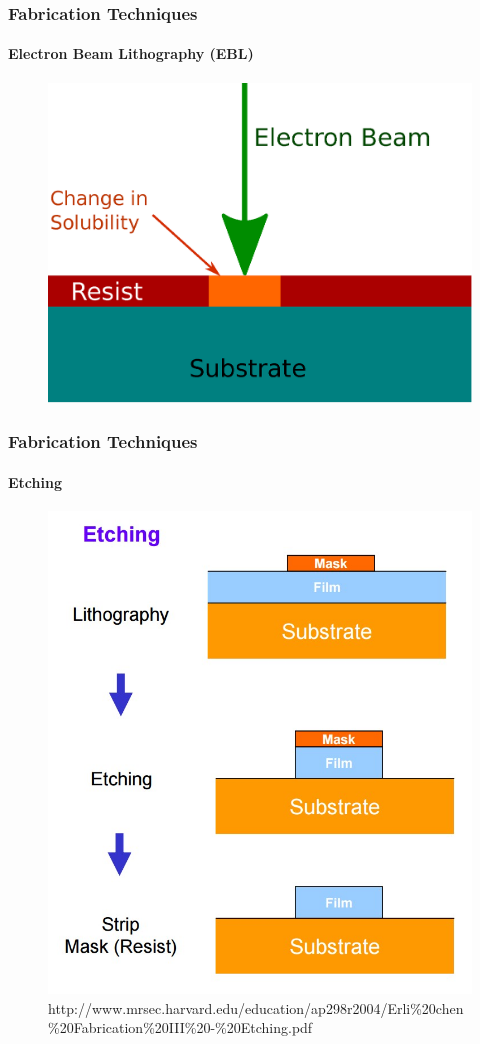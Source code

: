 \documentclass{beamer}
\begin{document}

\begin{frame}
    \frametitle{Fabrication Techniques}
    \framesubtitle{Electron Beam Lithography (EBL)}
    \begin{figure}[!htb]
        \centering
        \includegraphics[height=0.8\textheight]{img/ebeam.eps}
    \end{figure}
\end{frame}


\begin{frame}
    \frametitle{Fabrication Techniques}
    \framesubtitle{Etching}
    \begin{figure}[ht!]
        \centering
        \includegraphics[height=0.6\textheight]{img/etching.jpg}
        \caption[10pt]{http://www.mrsec.harvard.edu/education/ap298r2004/Erli\%20chen\%20Fabrication\%20III\%20-\%20Etching.pdf}
    \end{figure}
\end{frame}
\end{document}
